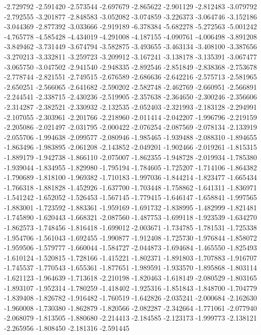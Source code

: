 -2.729792
-2.591420
-2.573544
-2.697679
-2.865622
-2.901129
-2.812483
-3.079792
-2.792555
-3.201877
-2.848583
-3.052082
-3.074859
-3.226373
-3.064746
-3.152186
-3.044369
-2.877392
-3.033666
-2.919189
-6.378384
-5.682278
-5.272563
-5.001242
-4.765778
-4.585428
-4.434019
-4.291008
-4.187155
-4.090761
-4.006498
-3.891208
-3.849462
-3.731449
-3.674794
-3.582875
-3.493655
-3.463134
-3.408100
-3.387656
-3.270213
-3.332811
-3.259723
-3.209912
-3.167241
-3.138178
-3.135391
-3.067477
-3.065750
-3.047502
-2.941540
-2.948335
-2.892546
-2.851849
-2.838368
-2.753678
-2.778744
-2.821551
-2.749515
-2.676589
-2.686636
-2.642216
-2.575713
-2.581965
-2.650251
-2.566065
-2.641682
-2.590202
-2.582748
-2.462769
-2.660951
-2.566891
-2.244541
-2.338715
-2.430236
-2.519905
-2.357638
-2.364650
-2.300246
-2.356606
-2.314287
-2.382521
-2.330932
-2.132535
-2.052403
-2.321993
-2.183128
-2.294991
-2.107055
-2.303961
-2.201766
-2.218960
-2.011414
-2.042207
-1.996796
-2.219159
-2.205086
-2.021497
-2.031795
-2.000422
-2.076254
-2.087569
-2.078134
-2.133919
-2.055706
-1.994638
-2.099577
-2.080946
-1.985465
-1.939488
-2.088310
-1.894655
-1.863496
-1.983895
-2.061208
-2.143852
-2.049201
-1.902466
-2.019261
-1.815315
-1.889179
-1.942738
-1.866110
-2.075007
-1.862355
-1.948728
-2.019934
-1.785380
-1.939044
-1.834955
-1.829980
-1.795194
-1.784605
-1.725207
-1.714106
-1.864382
-1.790689
-1.818100
-1.969382
-1.710183
-1.997036
-1.844214
-1.823477
-1.665434
-1.766318
-1.881828
-1.452926
-1.637700
-1.703448
-1.758862
-1.641311
-1.836971
-1.541242
-1.652052
-1.526453
-1.567145
-1.779415
-1.646147
-1.658841
-1.997565
-1.883001
-1.723592
-1.883361
-1.959169
-1.691732
-1.838995
-1.482999
-1.821481
-1.745890
-1.620443
-1.668321
-2.087560
-1.487753
-1.699118
-1.923539
-1.634270
-1.862573
-1.748456
-1.816418
-1.699012
-2.003671
-1.734785
-1.781531
-1.725338
-1.954706
-1.561043
-1.692455
-1.990877
-1.912408
-1.725730
-1.976844
-1.858072
-1.959506
-1.579777
-1.660044
-1.584727
-2.044873
-1.694684
-1.465550
-1.825493
-1.610124
-1.520815
-1.728166
-1.415221
-1.802371
-1.891803
-1.707883
-1.916707
-1.745537
-1.770543
-1.655361
-1.877651
-1.989591
-1.933570
-1.895868
-1.803114
-1.621123
-1.964639
-1.713618
-2.210198
-1.820463
-1.618149
-2.080529
-1.803165
-1.893107
-1.952314
-1.780259
-1.418402
-1.925316
-1.851843
-1.848700
-1.704779
-1.839408
-1.826782
-1.916482
-1.760519
-1.642826
-2.035241
-2.000684
-2.162630
-1.960008
-1.730380
-1.862879
-1.820566
-2.082287
-2.342664
-1.771061
-2.077940
-2.068079
-1.813505
-1.880680
-2.214413
-2.184585
-2.123173
-1.999773
-2.138121
-2.265956
-1.808450
-2.181316
-2.591445
